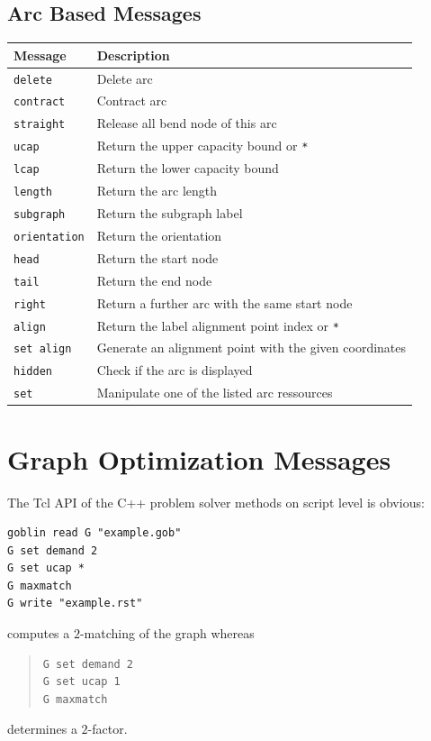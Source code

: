 \documentclass[a4paper,11pt,twoside]{book}
\begin{document}
\subsection{Arc Based Messages}
\label{slb_arc_messages}
\medskip
\begin{center}
\begin{tabular}{|p{3cm}|p{21.5cm}|}
\hline
{\bf Message}       & {\bf Description} \\
\hline
\hline
\verb/delete/       & Delete arc \\
\hline
\verb/contract/     & Contract arc \\
\hline
\verb/straight/     & Release all bend node of this arc \\
\hline
\verb/ucap/         & Return the upper capacity bound or \verb/*/ \\
\hline
\verb/lcap/         & Return the lower capacity bound \\
\hline
\verb/length/       & Return the arc length \\
\hline
\verb/subgraph/     & Return the subgraph label \\
\hline
\verb/orientation/  & Return the orientation \\
\hline
\verb/head/         & Return the start node \\
\hline
\verb/tail/         & Return the end node \\
\hline
\verb/right/        & Return a further arc with the same start node \\
\hline
\verb/align/        & Return the label alignment point index or \verb/*/ \\
\hline
\verb/set align/    & Generate an alignment point with the given coordinates \\
\hline
\verb/hidden/       & Check if the arc is displayed \\
\hline
\verb/set/          & Manipulate one of the listed arc ressources \\
\hline
\end{tabular}
\end{center}


\clearpage
{}
\section{Graph Optimization Messages}
The Tcl API of the C++ problem solver methods on script level is obvious:
\begin{mysample}
\begin{verbatim}
goblin read G "example.gob"
G set demand 2
G set ucap *
G maxmatch
G write "example.rst"
\end{verbatim}
\end{mysample}
computes a $2$-matching of the graph whereas
\begin{quote}
\begin{verbatim}
G set demand 2
G set ucap 1
G maxmatch
\end{verbatim}
\end{quote}
determines a $2$-factor.
\end{document}
